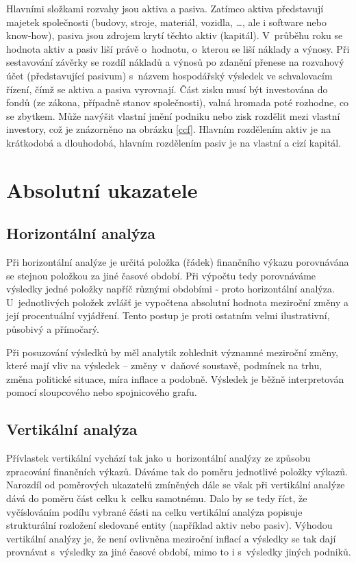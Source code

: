 Hlavními složkami rozvahy jsou aktiva a pasiva. Zatímco aktiva představují majetek společnosti (budovy, stroje, materiál, vozidla, \dots, ale i software nebo know-how), pasiva jsou zdrojem krytí těchto aktiv (kapitál). V~průběhu roku se hodnota aktiv a pasiv liší právě o~hodnotu, o~kterou se liší náklady a výnosy. Při sestavování závěrky se rozdíl nákladů a výnosů po zdanění přenese na rozvahový účet (představující pasivum) s~názvem hospodářský výsledek ve schvalovacím řízení, čímž se aktiva a pasiva vyrovnají. Část zisku musí být investována do fondů (ze zákona, případně stanov společnosti), valná hromada poté rozhodne, co se zbytkem. Může navýšit vlastní jmění podniku nebo zisk rozdělit mezi vlastní investory, což je znázorněno na obrázku \ref{ccf}. Hlavním rozdělením aktiv je na krátkodobá a dlouhodobá, hlavním rozdělením pasiv je na vlastní a cizí kapitál.

\section{Absolutní ukazatele}

\subsection{Horizontální analýza}
Při horizontální analýze je určitá položka (řádek) finančního výkazu porovnávána se stejnou položkou za jiné časové období. Při výpočtu tedy porovnáváme výsledky jedné položky napříč různými obdobími - proto horizontální analýza. U~jednotlivých položek zvlášť je vypočtena absolutní hodnota meziroční změny a její procentuální vyjádření. Tento postup je proti ostatním velmi ilustrativní, působivý a přímočarý. 

Při posuzování výsledků by měl analytik zohlednit významné meziroční změny, které mají vliv na výsledek -- změny v~daňové soustavě, podmínek na trhu, změna politické situace, míra inflace a podobně. Výsledek je běžně interpretován pomocí sloupcového nebo spojnicového grafu. 


\subsection{Vertikální analýza}
Přívlastek vertikální vychází tak jako u~horizontální analýzy ze způsobu zpracování finančních výkazů. Dáváme tak do poměru jednotlivé položky výkazů. Narozdíl od poměrových ukazatelů zmíněných dále se však při vertikální analýze dává do poměru část celku k~celku samotnému. Dalo by se tedy říct, že vyčíslováním podílu vybrané části na celku vertikální analýza popisuje strukturální rozložení sledované entity (například aktiv nebo pasiv). 
Výhodou vertikální analýzy je, že není ovlivněna meziroční inflací a výsledky se tak dají provnávat s~výsledky za jiné časové období, mimo to i s~výsledky jiných podniků\cite{sedl}.

